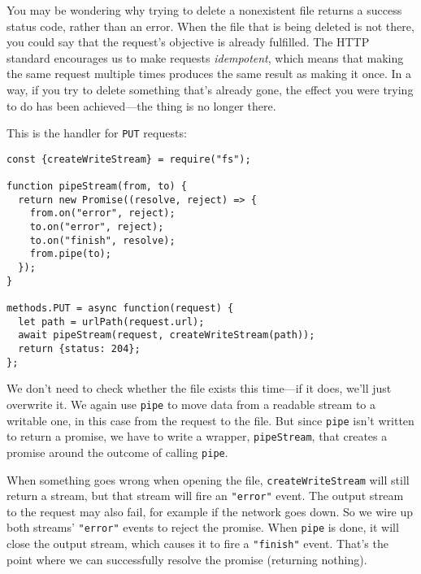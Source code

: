 You may be wondering why trying to delete a nonexistent file returns a success status code, rather than an error. When the file that is being deleted is not there, you could say that the request's objective is already fulfilled. The HTTP standard encourages us to make requests \emph{idempotent}, which means that making the same request multiple times produces the same result as making it once. In a way, if you try to delete something that's already gone, the effect you were trying to do has been achieved—the thing is no longer there.

This is the handler for \lstinline`PUT` requests:

\begin{lstlisting}
const {createWriteStream} = require("fs");

function pipeStream(from, to) {
  return new Promise((resolve, reject) => {
    from.on("error", reject);
    to.on("error", reject);
    to.on("finish", resolve);
    from.pipe(to);
  });
}

methods.PUT = async function(request) {
  let path = urlPath(request.url);
  await pipeStream(request, createWriteStream(path));
  return {status: 204};
};
\end{lstlisting}
\noindent{}

We don't need to check whether the file exists this time—if it does, we'll just overwrite it. We again use \lstinline`pipe` to move data from a readable stream to a writable one, in this case from the request to the file. But since \lstinline`pipe` isn't written to return a promise, we have to write a wrapper, \lstinline`pipeStream`, that creates a promise around the outcome of calling \lstinline`pipe`.

When something goes wrong when opening the file, \lstinline`createWriteStream` will still return a stream, but that stream will fire an \lstinline`"error"` event. The output stream to the request may also fail, for example if the network goes down. So we wire up both streams' \lstinline`"error"` events to reject the promise. When \lstinline`pipe` is done, it will close the output stream, which causes it to fire a \lstinline`"finish"` event. That's the point where we can successfully resolve the promise (returning nothing).

